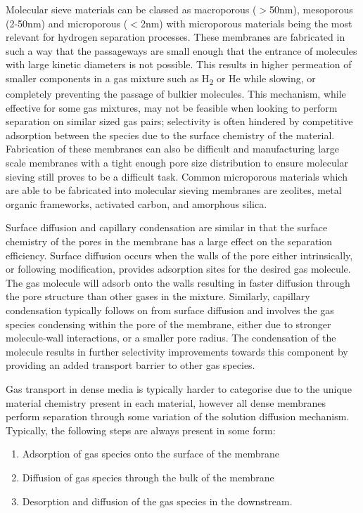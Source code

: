 Molecular sieve materials can be classed as macroporous ($>$50nm), mesoporous (2-50nm) and microporous ($<$2nm) 
with microporous materials being the most relevant for hydrogen separation processes. These membranes are 
fabricated in such a way that the passageways are small enough that the entrance of molecules with large 
kinetic diameters is not possible. This results in higher permeation of smaller components in a gas mixture 
such as H\textsubscript{2} or He while slowing, or completely preventing the passage of bulkier molecules. This mechanism, 
while effective for some gas mixtures, may not be feasible when looking to perform separation on similar 
sized gas pairs; selectivity is often hindered by competitive adsorption between the species due to the 
surface chemistry of the material. Fabrication of these membranes can also be difficult and manufacturing 
large scale membranes with a tight enough pore size distribution to ensure molecular sieving still proves 
to be a difficult task. Common microporous materials which are able to be fabricated into molecular sieving 
membranes are zeolites, metal organic frameworks, activated carbon, and amorphous silica.

Surface diffusion and capillary condensation are similar in that the surface chemistry of the pores in the 
membrane has a large effect on the separation efficiency. Surface diffusion occurs when the walls of the pore 
either intrinsically, or following modification, provides adsorption sites for the desired gas molecule. 
The gas molecule will adsorb onto the walls resulting in faster diffusion through the pore structure than 
other gases in the mixture. Similarly, capillary condensation typically follows on from surface diffusion 
and involves the gas species condensing within the pore of the membrane, either due to stronger molecule-wall 
interactions, or a smaller pore radius. The condensation of the molecule results in further selectivity 
improvements towards this component by providing an added transport barrier to other gas species. 

Gas transport in dense media is typically harder to categorise due to the unique material chemistry present 
in each material, however all dense membranes perform separation through some variation of the solution 
diffusion mechanism. Typically, the following steps are always present in some form:
\begin{enumerate}
\item Adsorption of gas species onto the surface of the membrane 
\item Diffusion of gas species through the bulk of the membrane 
\item Desorption and diffusion of the gas species in the downstream. 
\end{enumerate}

